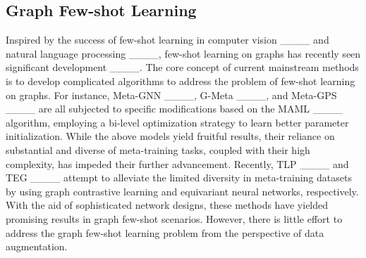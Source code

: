\subsection{Graph Few-shot Learning}
Inspired by the success of few-shot learning in computer vision ____ and natural language processing ____, few-shot learning on graphs has recently seen significant development ____. %
The core concept of current mainstream methods is to develop complicated algorithms to address the problem of few-shot learning on graphs. For instance, Meta-GNN ____, G-Meta ____, and Meta-GPS ____ are all subjected to specific modifications based on the MAML ____ algorithm, employing a bi-level optimization strategy to learn better parameter initialization. %
While the above models yield fruitful results, their reliance on substantial and diverse of meta-training tasks, coupled with their high complexity, has impeded their further advancement. %
Recently, TLP ____ and TEG ____ attempt to alleviate the limited diversity in meta-training datasets by using graph contrastive learning and equivariant neural networks, respectively. %
With the aid of sophisticated network designs, these methods have yielded promising results in graph few-shot scenarios. %
However, there is little effort to address the graph few-shot learning problem from the perspective of data augmentation.